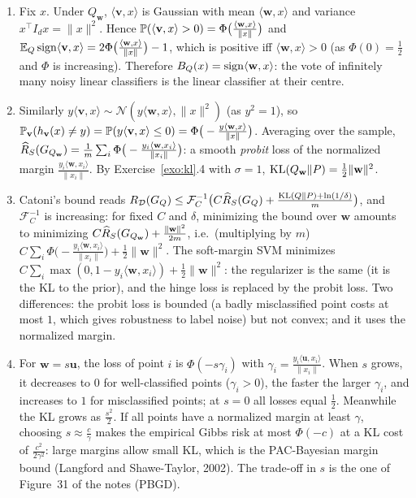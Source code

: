 \documentclass[11pt]{article}
\newcounter{exo}
\begin{document}
\begin{solution}
\begin{enumerate}
\item Fix $x$. Under $Q_{\mathbf w}$, $\langle\mathbf v,x\rangle$ is Gaussian with mean $\langle\mathbf w,x\rangle$ and variance
      $x^\top I_dx=\|x\|^2$. Hence $\P(\langle\mathbf v,x\rangle>0)=\Phi\big(\frac{\langle\mathbf w,x\rangle}{\|x\|}\big)$ and
      $\E_Q\sign\langle\mathbf v,x\rangle=2\Phi\big(\frac{\langle\mathbf w,x\rangle}{\|x\|}\big)-1$, which is positive iff
      $\langle\mathbf w,x\rangle>0$ (as $\Phi(0)=\frac12$ and $\Phi$ is increasing). Therefore $\BQ(x)=\sign\langle\mathbf w,x\rangle$:
      the vote of infinitely many noisy linear classifiers is the linear classifier at their centre.
\item Similarly $y\langle\mathbf v,x\rangle\sim\mathcal N(y\langle\mathbf w,x\rangle,\|x\|^2)$ (as $y^2=1$), so
      $\P_{\mathbf v}(h_{\mathbf v}(x)\neq y)=\P(y\langle\mathbf v,x\rangle\leq0)=\Phi\big(-\frac{y\langle\mathbf w,x\rangle}{\|x\|}\big)$.
      Averaging over the sample, $\RS(G_{Q_{\mathbf w}})=\frac1m\sum_i\Phi\big(-\frac{y_i\langle\mathbf w,x_i\rangle}{\|x_i\|}\big)$: a
      smooth \emph{probit} loss of the normalized margin $\frac{y_i\langle\mathbf w,x_i\rangle}{\|x_i\|}$. By
      Exercise~\ref{exo:kl}.4 with $\sigma=1$, $\KL(Q_{\mathbf w}\|P)=\frac12\|\mathbf w\|^2$.
\item Catoni's bound reads $\RD(\GQ)\leq\mathcal F_C^{-1}\big(C\RS(\GQ)+\frac{\KL(Q\|P)+\ln(1/\delta)}m\big)$, and
      $\mathcal F_C^{-1}$ is increasing: for fixed $C$ and $\delta$, minimizing the bound over $\mathbf w$ amounts to minimizing
      $C\RS(G_{Q_{\mathbf w}})+\frac{\|\mathbf w\|^2}{2m}$, i.e.\ (multiplying by $m$)
      $C\sum_i\Phi\big(-\frac{y_i\langle\mathbf w,x_i\rangle}{\|x_i\|}\big)+\frac12\|\mathbf w\|^2$. The soft-margin SVM minimizes
      $C\sum_i\max(0,1-y_i\langle\mathbf w,x_i\rangle)+\frac12\|\mathbf w\|^2$: the regularizer is the same (it is the KL to the
      prior), and the hinge loss is replaced by the probit loss. Two differences: the probit loss is bounded (a badly
      misclassified point costs at most $1$, which gives robustness to label noise) but not convex; and it uses the
      normalized margin.
\item For $\mathbf w=s\mathbf u$, the loss of point $i$ is $\Phi(-s\gamma_i)$ with $\gamma_i=\frac{y_i\langle\mathbf u,x_i\rangle}{\|x_i\|}$.
      When $s$ grows, it decreases to $0$ for well-classified points ($\gamma_i>0$), the faster the larger $\gamma_i$, and
      increases to $1$ for misclassified points; at $s=0$ all losses equal $\frac12$. Meanwhile the KL grows as $\frac{s^2}2$.
      If all points have a normalized margin at least $\gamma$, choosing $s\approx\frac{c}{\gamma}$ makes the empirical Gibbs
      risk at most $\Phi(-c)$ at a KL cost of $\frac{c^2}{2\gamma^2}$: large margins allow small KL, which is the
      PAC-Bayesian margin bound (Langford and Shawe-Taylor, 2002). The trade-off in $s$ is the one of Figure~31 of the notes (PBGD).
\end{enumerate}
\end{solution}
\end{document}
